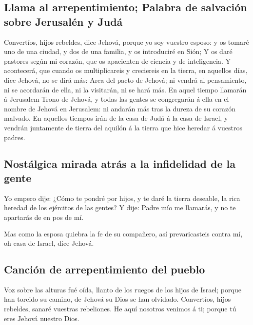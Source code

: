 \hypertarget{llama-al-arrepentimiento-palabra-de-salvaciuxf3n-sobre-jerusaluxe9n-y-juduxe1}{%
\subsection{Llama al arrepentimiento; Palabra de salvación sobre
Jerusalén y
Judá}\label{llama-al-arrepentimiento-palabra-de-salvaciuxf3n-sobre-jerusaluxe9n-y-juduxe1}}

 Convertíos, hijos rebeldes, dice Jehová, porque yo soy
vuestro esposo: y os tomaré uno de una ciudad, y dos de una familia, y
os introduciré en Sión;  Y os daré pastores según mi
corazón, que os apacienten de ciencia y de inteligencia. 
Y acontecerá, que cuando os multiplicareis y creciereis en la tierra, en
aquellos días, dice Jehová, no se dirá más: Arca del pacto de Jehová; ni
vendrá al pensamiento, ni se acordarán de ella, ni la visitarán, ni se
hará más.  En aquel tiempo llamarán á Jerusalem Trono de
Jehová, y todas las gentes se congregarán á ella en el nombre de Jehová
en Jerusalem: ni andarán más tras la dureza de su corazón malvado.
 En aquellos tiempos irán de la casa de Judá á la casa de
Israel, y vendrán juntamente de tierra del aquilón á la tierra que hice
heredar á vuestros padres.

\hypertarget{nostuxe1lgica-mirada-atruxe1s-a-la-infidelidad-de-la-gente}{%
\subsection{Nostálgica mirada atrás a la infidelidad de la
gente}\label{nostuxe1lgica-mirada-atruxe1s-a-la-infidelidad-de-la-gente}}

 Yo empero dije: ¿Cómo te pondré por hijos, y te daré la
tierra deseable, la rica heredad de los ejércitos de las gentes? Y dije:
Padre mío me llamarás, y no te apartarás de en pos de mí.

 Mas como la esposa quiebra la fe de su compañero, así
prevaricasteis contra mí, oh casa de Israel, dice Jehová.

\hypertarget{canciuxf3n-de-arrepentimiento-del-pueblo}{%
\subsection{Canción de arrepentimiento del
pueblo}\label{canciuxf3n-de-arrepentimiento-del-pueblo}}

 Voz sobre las alturas fué oída, llanto de los ruegos de
los hijos de Israel; porque han torcido su camino, de Jehová su Dios se
han olvidado.  Convertíos, hijos rebeldes, sanaré
vuestras rebeliones. He aquí nosotros venimos á ti; porque tú eres
Jehová nuestro Dios.

